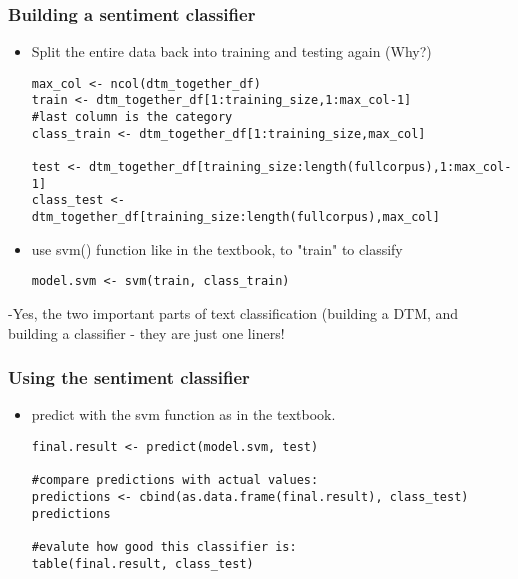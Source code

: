 \documentclass{beamer}
\begin{document}
\begin{frame}[fragile]
\frametitle{Building a sentiment classifier}
\begin{itemize} \small
\item Split the entire data back into training and testing again (Why?) 
\scriptsize
\begin{verbatim}
max_col <- ncol(dtm_together_df)
train <- dtm_together_df[1:training_size,1:max_col-1] 
#last column is the category
class_train <- dtm_together_df[1:training_size,max_col]

test <- dtm_together_df[training_size:length(fullcorpus),1:max_col-1]
class_test <- dtm_together_df[training_size:length(fullcorpus),max_col]
\end{verbatim} \small
\item use svm() function like in the textbook, to "train" to classify
\begin{verbatim}
model.svm <- svm(train, class_train)
\end{verbatim}
\end{itemize} \small
-Yes, the two important parts of text classification (building a DTM, and building a classifier - they are just one liners!
\end{frame}

\begin{frame}[fragile]
\frametitle{Using the sentiment classifier}
\begin{itemize}
\item predict with the svm function as in the textbook.
\footnotesize
\begin{verbatim}
final.result <- predict(model.svm, test)

#compare predictions with actual values:
predictions <- cbind(as.data.frame(final.result), class_test)
predictions

#evalute how good this classifier is:
table(final.result, class_test)
\end{verbatim}
\end{itemize}
\end{frame}
\end{document}

